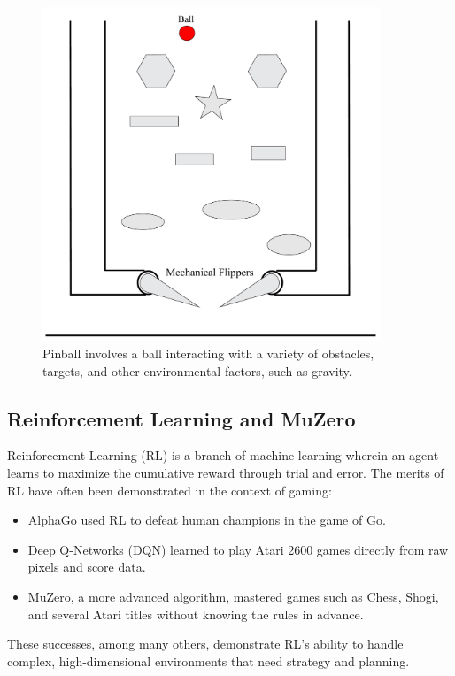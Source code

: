 \documentclass{article}
\begin{document}
\begin{figure}[H]
    \centering
    \includegraphics[width=0.9\textwidth]{pinball_example.pdf}
    \caption{Pinball involves a ball interacting with a variety of obstacles, targets, and other environmental factors, such as gravity.}
    \label{fig:pinball_example}
\end{figure}

\subsection{Reinforcement Learning and MuZero}
Reinforcement Learning (RL) is a branch of machine learning wherein an agent learns to maximize the cumulative reward through trial and error. The merits of RL have often been demonstrated in the context of gaming:
\begin{itemize}
    \item AlphaGo used RL to defeat human champions in the game of Go.
    \item Deep Q-Networks (DQN) learned to play Atari 2600 games directly from raw pixels and score data.
    \item MuZero, a more advanced algorithm, mastered games such as Chess, Shogi, and several Atari titles without knowing the rules in advance.
\end{itemize}
These successes, among many others, demonstrate RL's ability to handle complex, high-dimensional environments that need strategy and planning.
\end{document}
